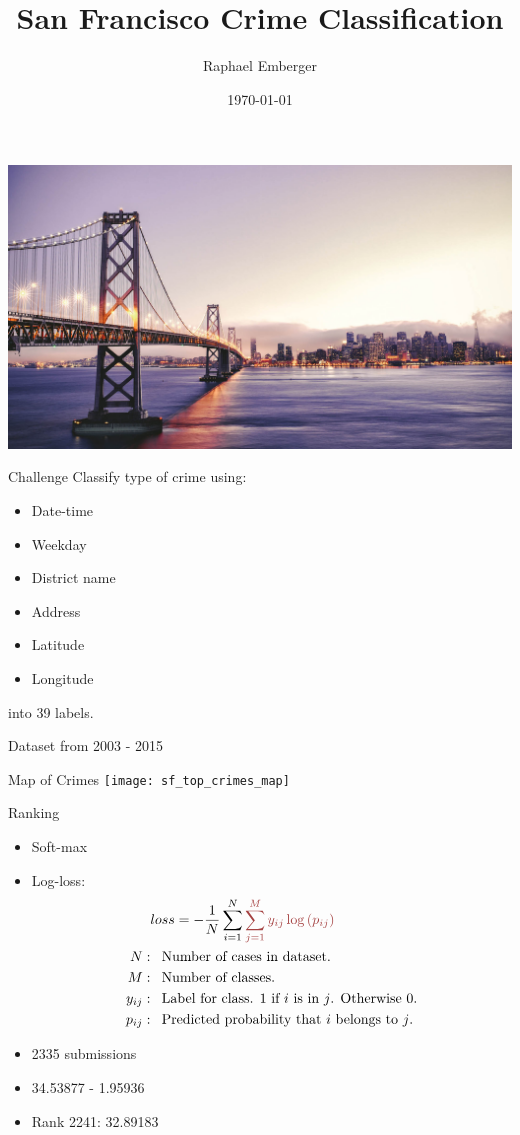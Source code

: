 \documentclass[11pt]{beamer}
\author{Raphael Emberger}
\title{San Francisco Crime Classification}
\institute{NUT}
\date{\today}
\begin{document}
\begin{frame}
\centering
\includegraphics[width=\textwidth]{San-Francisco}
\titlepage
\end{frame}

\begin{frame}{Challenge}
Classify type of crime using:
\begin{itemize}
\item Date-time
\item Weekday
\item District name
\item Address
\item Latitude
\item Longitude
\end{itemize}
into 39 labels.

Dataset from 2003 - 2015
\end{frame}

\begin{frame}{Map of Crimes}
\centering
\texttt{[image: sf\_top\_crimes\_map]}
\end{frame}

\begin{frame}{Ranking}
\begin{itemize}
\item Soft-max
\item Log-loss:
\begin{align}\label{eqn:loss}
&loss = -\frac1N\sum_{i=1}^N{\color{Red}\sum_{j=1}^My_{ij}\log\left(p_{ij}\right)}\\
\nonumber
N: & \hspace{8pt} \textrm{Number of cases in dataset.}\\
\nonumber
M: & \hspace{8pt} \textrm{Number of classes.}\\
\nonumber
y_{ij}: & \hspace{8pt} \textrm{Label for class. 1 if $i$ is in $j$. Otherwise 0.}\\
\nonumber
p_{ij}: & \hspace{8pt} \textrm{Predicted probability that $i$ belongs to $j$.}
\end{align}
\item 2335 submissions
\item 34.53877 - 1.95936
\item Rank 2241: 32.89183
\end{itemize}
\end{frame}
\end{document}
